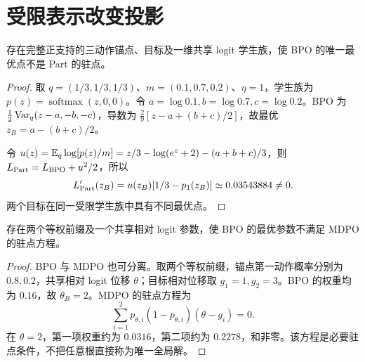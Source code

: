 \section{受限表示改变投影}
\begin{proposition}
存在完整正支持的三动作锚点、目标及一维共享 logit 学生族，使 BPO 的唯一最优点不是 Part 的驻点。
\end{proposition}
\begin{proof}
取 $q=(1/3,1/3,1/3)$、$m=(0.1,0.7,0.2)$、$\eta=1$，学生族为 $p(z)=\operatorname{softmax}(z,0,0)$。令 $a=\log0.1,b=\log0.7,c=\log0.2$。BPO 为 $\frac12\operatorname{Var}_q(z-a,-b,-c)$，导数为 $\frac29[z-a+(b+c)/2]$，故最优 $z_B=a-(b+c)/2$。

令 $u(z)=\mathbb E_q\log[p(z)/m]=z/3-\log(e^z+2)-(a+b+c)/3$，则 $L_{\rm Part}=L_{\rm BPO}+u^2/2$，所以
\begin{equation}
L_{\rm Part}'(z_B)=u(z_B)[1/3-p_1(z_B)]\simeq0.03543884\ne0.
\end{equation}
两个目标在同一受限学生族中具有不同最优点。
\end{proof}

\begin{proposition}
存在两个等权前缀及一个共享相对 logit 参数，使 BPO 的最优参数不满足 MDPO 的驻点方程。
\end{proposition}
\begin{proof}
BPO 与 MDPO 也可分离。取两个等权前缀，锚点第一动作概率分别为 $0.8,0.2$，共享相对 logit 位移 $\theta$；目标相对位移取 $g_1=1,g_2=3$。BPO 的权重均为 $0.16$，故 $\theta_B=2$。MDPO 的驻点方程为
\begin{equation}
\sum_{i=1}^2p_{\theta,i}(1-p_{\theta,i})(\theta-g_i)=0.
\end{equation}
在 $\theta=2$，第一项权重约为 $0.0316$，第二项约为 $0.2278$，和非零。该方程是必要驻点条件，不把任意根直接称为唯一全局解。
\end{proof}

